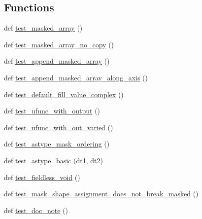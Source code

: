 \subsection*{Functions}
\begin{DoxyCompactItemize}
\item 
def \hyperlink{namespacenumpy_1_1ma_1_1tests_1_1test__core_a522f757b394a44701806a0d9b08a96a4}{test\+\_\+masked\+\_\+array} ()
\item 
def \hyperlink{namespacenumpy_1_1ma_1_1tests_1_1test__core_a69be9c9f87ca1221ad3f59440897bbc2}{test\+\_\+masked\+\_\+array\+\_\+no\+\_\+copy} ()
\item 
def \hyperlink{namespacenumpy_1_1ma_1_1tests_1_1test__core_a3a345559367c82fb404a3c193eb84160}{test\+\_\+append\+\_\+masked\+\_\+array} ()
\item 
def \hyperlink{namespacenumpy_1_1ma_1_1tests_1_1test__core_a88b340e025cc9b94a4bd61b49e6e9d48}{test\+\_\+append\+\_\+masked\+\_\+array\+\_\+along\+\_\+axis} ()
\item 
def \hyperlink{namespacenumpy_1_1ma_1_1tests_1_1test__core_a8768dc731e7abe69511db880414f0f40}{test\+\_\+default\+\_\+fill\+\_\+value\+\_\+complex} ()
\item 
def \hyperlink{namespacenumpy_1_1ma_1_1tests_1_1test__core_adbb3ec6abdf4545f5238805a5d8e3695}{test\+\_\+ufunc\+\_\+with\+\_\+output} ()
\item 
def \hyperlink{namespacenumpy_1_1ma_1_1tests_1_1test__core_aea65c785bc94e195e245a7a602abc73b}{test\+\_\+ufunc\+\_\+with\+\_\+out\+\_\+varied} ()
\item 
def \hyperlink{namespacenumpy_1_1ma_1_1tests_1_1test__core_ab71795da3324ff8086e32fef257f030e}{test\+\_\+astype\+\_\+mask\+\_\+ordering} ()
\item 
def \hyperlink{namespacenumpy_1_1ma_1_1tests_1_1test__core_ad35fca39cfdbd505a29ecb18815c0981}{test\+\_\+astype\+\_\+basic} (dt1, dt2)
\item 
def \hyperlink{namespacenumpy_1_1ma_1_1tests_1_1test__core_ad396d88ea5a33f79a4b67117713ed2e7}{test\+\_\+fieldless\+\_\+void} ()
\item 
def \hyperlink{namespacenumpy_1_1ma_1_1tests_1_1test__core_a3760f2cd56bc89e2aecc94ae4d767704}{test\+\_\+mask\+\_\+shape\+\_\+assignment\+\_\+does\+\_\+not\+\_\+break\+\_\+masked} ()
\item 
def \hyperlink{namespacenumpy_1_1ma_1_1tests_1_1test__core_afaa3660bd52e339b95ced5f37084bc92}{test\+\_\+doc\+\_\+note} ()
\end{DoxyCompactItemize}

